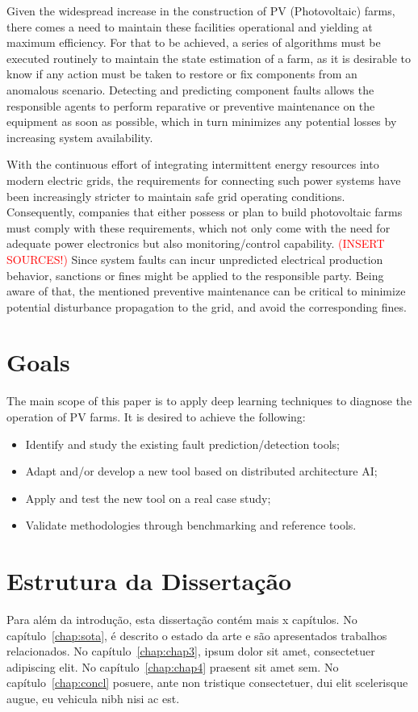 Given the widespread increase in the construction of PV (Photovoltaic) farms, there
comes a need to maintain these facilities operational and yielding at maximum
efficiency. For that to be achieved, a series of algorithms must be executed
routinely to maintain the state estimation of a farm, as it is
desirable to know if any action must be taken to restore or fix components from
an anomalous scenario. Detecting and predicting component faults allows the
responsible agents to perform reparative or preventive maintenance on the
equipment as soon as possible, which in turn minimizes any potential losses by
increasing system availability.

With the continuous effort of integrating intermittent energy resources into
modern electric grids, the requirements for connecting such power systems have
been increasingly stricter to maintain safe grid operating conditions.
Consequently, companies that either possess or plan to build photovoltaic farms
must comply with these requirements, which not only come with the need for adequate
power electronics but also monitoring/control capability.
\textcolor{red}{(INSERT SOURCES!)}
Since system faults can incur unpredicted electrical production behavior,
sanctions or fines might be applied to the responsible party. Being aware of
that, the mentioned preventive maintenance can be critical to minimize
potential disturbance propagation to the grid, and avoid the
corresponding fines.

\section{Goals} \label{sec:goals}

The main scope of this paper is to apply deep learning techniques to diagnose
the operation of PV farms. It is desired to achieve the following:

\begin{itemize}
  \item Identify and study the existing fault prediction/detection tools;
  \item Adapt and/or develop a new tool based on distributed architecture AI;
  \item Apply and test the new tool on a real case study;
  \item Validate methodologies through benchmarking and reference tools.
\end{itemize}


\section{Estrutura da Dissertação} \label{sec:struct}

Para além da introdução, esta dissertação contém mais x capítulos.
No capítulo~\ref{chap:sota}, é descrito o estado da arte e são
apresentados trabalhos relacionados. 
No capítulo~\ref{chap:chap3}, ipsum dolor sit amet, consectetuer
adipiscing elit.
No capítulo~\ref{chap:chap4} praesent sit amet sem. 
No capítulo~\ref{chap:concl}  posuere, ante non tristique
consectetuer, dui elit scelerisque augue, eu vehicula nibh nisi ac
est. 
